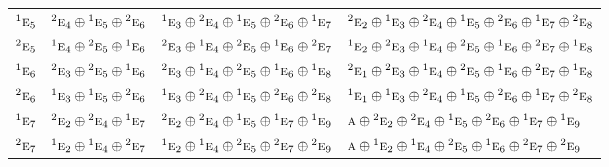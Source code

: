 \documentclass[10pt,a4paper]{article}
\numberwithin{equation}{section}
\newcommand{\irr}[1]{\text{\normalfont\scshape #1}}
\newcommand{\conjpair}[1]{{}^{#1}}
\begin{document}
{\begin{longtable}{@{}llll@{}}
$\conjpair{1}\irr{e}_{5}$ & $\conjpair{2}\irr{e}_{4}\oplus \conjpair{1}\irr{e}_{5}\oplus \conjpair{2}\irr{e}_{6}$ & $\conjpair{1}\irr{e}_{3}\oplus \conjpair{2}\irr{e}_{4}\oplus \conjpair{1}\irr{e}_{5}\oplus \conjpair{2}\irr{e}_{6}\oplus \conjpair{1}\irr{e}_{7}$ & $\conjpair{2}\irr{e}_{2}\oplus \conjpair{1}\irr{e}_{3}\oplus \conjpair{2}\irr{e}_{4}\oplus \conjpair{1}\irr{e}_{5}\oplus \conjpair{2}\irr{e}_{6}\oplus \conjpair{1}\irr{e}_{7}\oplus \conjpair{2}\irr{e}_{8}$\\
$\conjpair{2}\irr{e}_{5}$ & $\conjpair{1}\irr{e}_{4}\oplus \conjpair{2}\irr{e}_{5}\oplus \conjpair{1}\irr{e}_{6}$ & $\conjpair{2}\irr{e}_{3}\oplus \conjpair{1}\irr{e}_{4}\oplus \conjpair{2}\irr{e}_{5}\oplus \conjpair{1}\irr{e}_{6}\oplus \conjpair{2}\irr{e}_{7}$ & $\conjpair{1}\irr{e}_{2}\oplus \conjpair{2}\irr{e}_{3}\oplus \conjpair{1}\irr{e}_{4}\oplus \conjpair{2}\irr{e}_{5}\oplus \conjpair{1}\irr{e}_{6}\oplus \conjpair{2}\irr{e}_{7}\oplus \conjpair{1}\irr{e}_{8}$\\
$\conjpair{1}\irr{e}_{6}$ & $\conjpair{2}\irr{e}_{3}\oplus \conjpair{2}\irr{e}_{5}\oplus \conjpair{1}\irr{e}_{6}$ & $\conjpair{2}\irr{e}_{3}\oplus \conjpair{1}\irr{e}_{4}\oplus \conjpair{2}\irr{e}_{5}\oplus \conjpair{1}\irr{e}_{6}\oplus \conjpair{1}\irr{e}_{8}$ & $\conjpair{2}\irr{e}_{1}\oplus \conjpair{2}\irr{e}_{3}\oplus \conjpair{1}\irr{e}_{4}\oplus \conjpair{2}\irr{e}_{5}\oplus \conjpair{1}\irr{e}_{6}\oplus \conjpair{2}\irr{e}_{7}\oplus \conjpair{1}\irr{e}_{8}$\\
$\conjpair{2}\irr{e}_{6}$ & $\conjpair{1}\irr{e}_{3}\oplus \conjpair{1}\irr{e}_{5}\oplus \conjpair{2}\irr{e}_{6}$ & $\conjpair{1}\irr{e}_{3}\oplus \conjpair{2}\irr{e}_{4}\oplus \conjpair{1}\irr{e}_{5}\oplus \conjpair{2}\irr{e}_{6}\oplus \conjpair{2}\irr{e}_{8}$ & $\conjpair{1}\irr{e}_{1}\oplus \conjpair{1}\irr{e}_{3}\oplus \conjpair{2}\irr{e}_{4}\oplus \conjpair{1}\irr{e}_{5}\oplus \conjpair{2}\irr{e}_{6}\oplus \conjpair{1}\irr{e}_{7}\oplus \conjpair{2}\irr{e}_{8}$\\
$\conjpair{1}\irr{e}_{7}$ & $\conjpair{2}\irr{e}_{2}\oplus \conjpair{2}\irr{e}_{4}\oplus \conjpair{1}\irr{e}_{7}$ & $\conjpair{2}\irr{e}_{2}\oplus \conjpair{2}\irr{e}_{4}\oplus \conjpair{1}\irr{e}_{5}\oplus \conjpair{1}\irr{e}_{7}\oplus \conjpair{1}\irr{e}_{9}$ & $\irr{a}\oplus \conjpair{2}\irr{e}_{2}\oplus \conjpair{2}\irr{e}_{4}\oplus \conjpair{1}\irr{e}_{5}\oplus \conjpair{2}\irr{e}_{6}\oplus \conjpair{1}\irr{e}_{7}\oplus \conjpair{1}\irr{e}_{9}$\\
$\conjpair{2}\irr{e}_{7}$ & $\conjpair{1}\irr{e}_{2}\oplus \conjpair{1}\irr{e}_{4}\oplus \conjpair{2}\irr{e}_{7}$ & $\conjpair{1}\irr{e}_{2}\oplus \conjpair{1}\irr{e}_{4}\oplus \conjpair{2}\irr{e}_{5}\oplus \conjpair{2}\irr{e}_{7}\oplus \conjpair{2}\irr{e}_{9}$ & $\irr{a}\oplus \conjpair{1}\irr{e}_{2}\oplus \conjpair{1}\irr{e}_{4}\oplus \conjpair{2}\irr{e}_{5}\oplus \conjpair{1}\irr{e}_{6}\oplus \conjpair{2}\irr{e}_{7}\oplus \conjpair{2}\irr{e}_{9}$\\

\end{longtable}}
\end{document}
